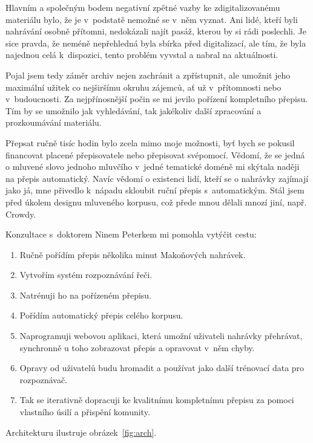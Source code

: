 Hlavním a společným bodem negativní zpětné vazby ke zdigitalizovanému materiálu
bylo, že je v~podstatě nemožné se v~něm vyznat. Ani lidé, kteří byli nahrávání
osobně přítomni, nedokázali najít pasáž, kterou by si rádi poslechli. Je
sice pravda, že neméně nepřehledná byla sbírka před digitalizací, ale tím, že
byla najednou celá k~dispozici, tento problém vyvstal a nabral na aktuálnosti.

Pojal jsem tedy záměr archiv nejen zachránit a zpřístupnit, ale umožnit jeho
maximální užitek co nejširšímu okruhu zájemců, ať už v~přítomnosti nebo
v~budoucnosti.
Za nejpřínosnější počin se mi jevilo pořízení kompletního
přepisu. Tím by se umožnilo jak vyhledávání, tak jakékoliv další zpracování a
prozkoumávání materiálu.

Přepsat ručně tisíc hodin bylo zcela mimo moje možnosti, byť bych se pokusil
financovat placené přepisovatele nebo
přepisovat svépomocí. Vědomí, že se jedná o mluvené slovo jednoho mluvčího
v~jedné tematické doméně mi skýtala naději na přepis automatický. Navíc vědomí o
existenci lidí, kteří se o nahrávky zajímají jako já, mne přivedlo
k~nápadu skloubit ruční přepis s~automatickým.
Stál jsem před úkolem designu mluveného korpusu, což přede mnou dělali mnozí jiní,
např. Crowdy\cite{crowdy1993spoken}.

Konzultace s~doktorem Ninem Peterkem mi pomohla vytýčit cestu:
\begin{enumerate}
\item{Ručně pořídím přepis několika minut Makoňových nahrávek.}
\item{Vytvořím systém rozpoznávání řeči.}
\item{Natrénuji ho na pořízeném přepisu.}
\item{Pořídím automatický přepis celého korpusu.}
\item{Naprogramuji webovou aplikaci, která umožní uživateli nahrávky přehrávat,
synchronně u toho zobrazovat přepis a opravovat v~něm chyby.}
\item{Opravy od uživatelů budu hromadit a používat jako další trénovací data pro
rozpoznávač.}
\item{Tak se iterativně dopracuji ke kvalitnímu kompletnímu přepisu za pomoci
vlastního úsilí a přispění komunity.}
\end{enumerate}

Architekturu ilustruje obrázek~\ref{fig:arch}.

